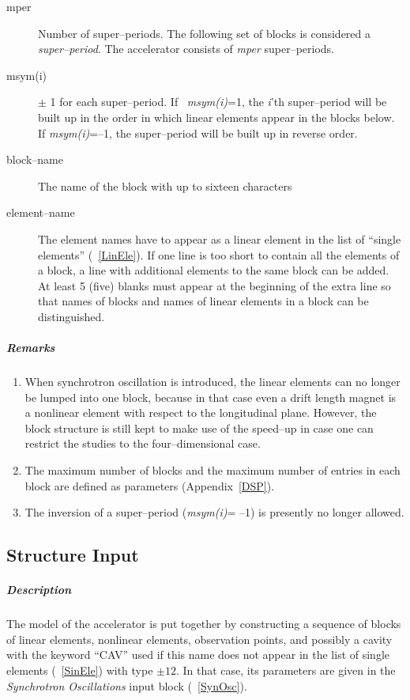 \documentclass[a4paper,11pt]{report}
\begin{document}
\begin{description}
\item [mper] Number of super--periods. The following set of blocks is
  considered a {\em super--period}\/. The accelerator consists of {\em
    mper} \/super--periods.
\item [msym(i)] $\pm$ 1 for each super--period.  If \mbox{{\em
      msym(i)}=1,} \/the \mbox{{\em i}\/'th} super--period will be
  built up in the order in which linear elements appear in the blocks
  below. If {\em msym(i)}\/=--1, the super--period will be built up in
  reverse order.
\item [block--name] The name of the block with up to sixteen
  characters
\item [element--name] The element names have to appear as a linear
  element in the list of ``single elements'' (~\ref{LinEle}). If one
  line is too short to contain all the elements of a block, a line
  with additional elements to the same block can be added.  At least 5
  (five) blanks must appear at the beginning of the extra line so that
  names of blocks and names of linear elements in a block can be
  distinguished.
\end{description}

\subparagraph{Remarks}
\begin{enumerate}
\item When synchrotron oscillation is introduced, the linear elements
  can no longer be lumped into one block, because in that case even a
  drift length magnet is a nonlinear element with respect to the
  longitudinal plane. However, the block structure is still kept to
  make use of the speed--up in case one can restrict the studies to
  the four--dimensional case.
\item The maximum number of blocks and the maximum number of entries
  in each block are defined as parameters (Appendix~\ref{DSP}).
\item The inversion of a super--period ({\em msym(i)}\/= --1) is
  presently no longer allowed.
\end{enumerate}

\subsection{Structure Input} \label{StrInp}

\subparagraph{Description} The model of the accelerator is put
together by constructing a sequence of blocks of linear elements,
nonlinear elements, observation points, and possibly a cavity with the
keyword ``CAV'' used if this name does not appear in the list of
single elements (~\ref{SinEle}) with type $\pm 12$. In that case, its
parameters are given in the {\em Synchrotron Oscillations} \/input
block (~\ref{SynOsc}).
\end{document}
